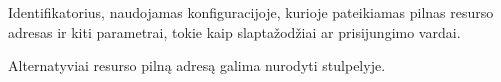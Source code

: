 \documentclass[letterpaper,10pt,lithuanian]{sphinxmanual}
\begin{document}

\begin{fulllineitems}
\label{\detokenize{dimensijos:resource.ref}}
\pysigstartsignatures
{}
\pysigstopsignatures
\sphinxAtStartPar
Identifikatorius, naudojamas konfiguracijoje, kurioje pateikiamas pilnas
resurso adresas ir kiti parametrai, tokie kaip slaptažodžiai ar
prisijungimo vardai.

\sphinxAtStartPar
Alternatyviai resurso pilną adresą galima nurodyti {\hyperref[\detokenize{dimensijos:resource.source}]{}}
stulpelyje.

\end{fulllineitems}

\end{document}
